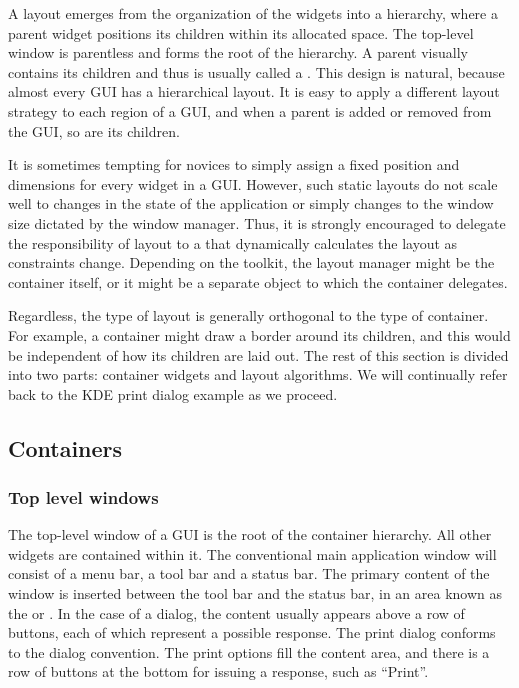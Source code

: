 A layout emerges from the organization of the widgets into a
hierarchy, where a parent widget positions its children within its
allocated space.  The top-level window is parentless and forms the
root of the hierarchy. A parent visually contains its children and
thus is usually called a . This design is natural,
because almost every GUI has a hierarchical layout. It is easy to
apply a different layout strategy to each region of a GUI, and when a
parent is added or removed from the GUI, so are its children.

It is sometimes tempting for novices to simply assign a fixed position
and dimensions for every widget in a GUI. However, such static layouts
do not scale well to changes in the state of the application or simply
changes to the window size dictated by the window manager. Thus, it is
strongly encouraged to delegate the responsibility of layout to a
 that dynamically calculates the layout as
constraints change. Depending on the toolkit, the layout manager might
be the container itself, or it might be a separate object to which the
container delegates.

Regardless, the type of layout is generally orthogonal to the type of
container. For example, a container might draw a border around its
children, and this would be independent of how its children are laid
out.  The rest of this section is divided into two parts: container
widgets and layout algorithms. We will continually refer back to the
KDE print dialog example as we proceed.


\subsection{Containers}
\label{sec:containers}

\subsubsection{Top level windows}
\label{sec:GUI:top-level-windows}

The top-level window of a GUI is the root of the container
hierarchy. All other widgets are contained within it.  The
conventional main application window will consist of a menu bar, a
tool bar and a status bar. The primary content of the window is
inserted between the tool bar and the status bar, in an area known as
the  or . In the case of a
dialog, the content usually appears above a row of buttons, each of
which represent a possible response. The print dialog conforms to the
dialog convention. The print options fill the content area, and there
is a row of buttons at the bottom for issuing a response, such as
``Print''.

